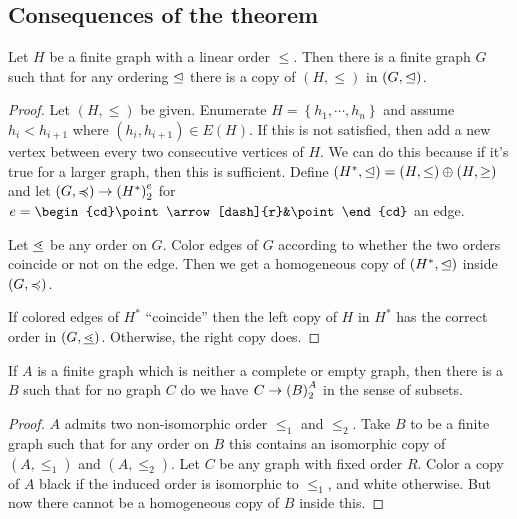 \documentclass{amsart}
\begin{document}
\subsection{Consequences of the theorem}

\begin{prop}
Let $H$ be a finite graph with a linear order $\leq$.
Then there is a finite graph $G$ such that for any ordering $\trianglelefteq$ there is a copy of
$\left( H , \leq \right)$ in $\left(G , \trianglelefteq\right)$.
\end{prop}

\begin{proof}
Let $\left( H , \leq \right)$ be given. Enumerate $H = \left\{ h_1 , \cdots , h_n
\right\}$ and assume $h_i < h_{i+1}$ where $\left( h_i , h_{i+1} \right)\in E\left( H
\right)$. If this is not satisfied, then add a new vertex between every two consecutive
vertices of $H$. We can do this because if it's true for a larger graph, then this is
sufficient.
Define $\left( H^* , \trianglelefteq \right) = \left( H , \leq \right)\oplus\left( H , \geq \right)$
and let $\left( G , \preccurlyeq \right)\rightarrow \left( H^* \right)_2^e$ for
$e=\begin{cd}\point\arrow[dash]{r}&\point\end{cd}$ an edge.

Let $\underline{\lessdot}$ be any order on $G$. Color edges of $G$ according to whether the two orders
coincide or not on the edge. Then we get a homogeneous copy of $\left( H^* , \trianglelefteq \right)$
inside $\left( G , \preccurlyeq \right)$.

If colored edges of $H^*$ ``coincide'' then the left copy of $H$ in $H^*$ has the
correct order in $\left( G , \underline{\lessdot} \right)$. Otherwise, the right copy does.
\end{proof}

\begin{prop}
If $A$ is a finite graph which is neither a complete or empty graph, then there is a $B$
such that for no graph $C$ do we have $C\rightarrow \left( B \right)_2^A$ in the sense of
subsets.
\end{prop}

\begin{proof}
$A$ admits two non-isomorphic order $\leq_1$ and $\leq_2$.
Take $B$ to be a finite graph such that for any order on $B$ this contains an isomorphic
copy of $\left( A , \leq_1 \right)$ and $\left( A , \leq_2 \right)$.
Let $C$ be any graph with fixed order $R$. Color a copy of $A$ black if the induced
order is isomorphic to $\leq_1$, and white otherwise. But now there cannot be a homogeneous
copy of $B$ inside this.
\end{proof}
\end{document}
